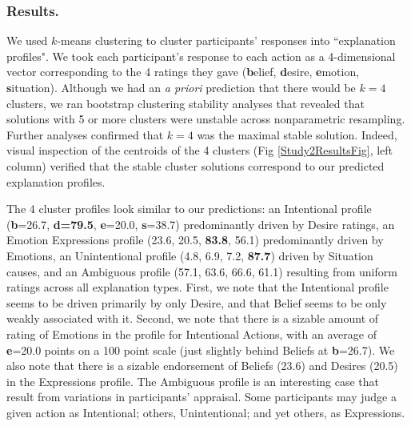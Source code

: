 \documentclass[10pt,letterpaper]{article}
\begin{document}
\subsubsection{Results.} 
We used $k$-means clustering to cluster participants' responses into ``explanation profiles". 
We took each participant's response to each action as a 4-dimensional vector corresponding to the 4 ratings they gave (\textbf{b}elief, \textbf{d}esire, \textbf{e}motion, \textbf{s}ituation). 
Although we had an \textit{a priori} prediction that there would be $k=4$ clusters, we ran bootstrap clustering stability analyses \cite{Hennig2007} that revealed that solutions with 5 or more clusters were unstable across nonparametric resampling. Further analyses confirmed that $k=4$ was the maximal stable solution. 
Indeed, visual inspection of the centroids of the 4 clusters (Fig \ref{Study2ResultsFig}, left column) verified that the stable cluster solutions correspond to our predicted explanation profiles.






The 4 cluster profiles look similar to our predictions: an Intentional profile (\textbf{b}=26.7, \textbf{d=79.5}, \textbf{e}=20.0, \textbf{s}=38.7) predominantly driven by Desire ratings, 
an Emotion Expressions profile (23.6, 20.5, \textbf{83.8}, 56.1) predominantly driven by Emotions, 
an Unintentional profile (4.8, 6.9, 7.2, \textbf{87.7}) driven by Situation causes, 
and an Ambiguous profile (57.1, 63.6, 66.6, 61.1) resulting from uniform ratings across all explanation types. First, we note that the Intentional profile seems to be driven primarily by only Desire, and that Belief seems to be only weakly associated with it. Second, we note that there is a sizable amount of rating of Emotions in the profile for Intentional Actions, with an average of \textbf{e}=20.0 points on a 100 point scale (just slightly behind Beliefs at \textbf{b}=26.7). We also note that there is a sizable endorsement of Beliefs (23.6) and Desires (20.5) in the Expressions profile. %
The Ambiguous profile is an interesting case that result from variations in participants' appraisal. Some participants may judge a given action as Intentional; others, Unintentional; and yet others, as Expressions. %
\end{document}
